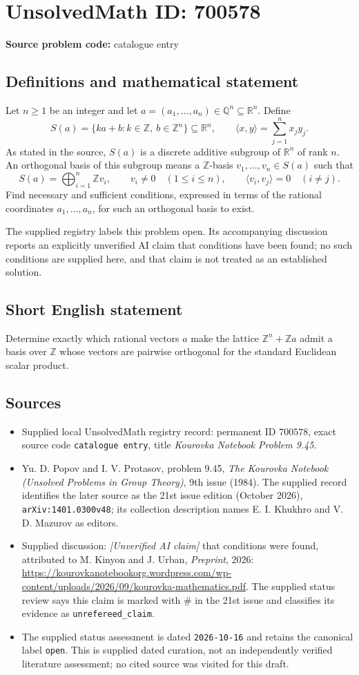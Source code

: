 \documentclass[11pt]{article}
\newcommand{\Z}{\mathbb{Z}}
\newcommand{\Q}{\mathbb{Q}}
\newcommand{\R}{\mathbb{R}}
\begin{document}
\section*{UnsolvedMath ID: 700578}
\textbf{Source problem code:} catalogue entry
\subsection{Definitions and mathematical statement}
Let \(n\geq 1\) be an integer and let \(a=(a_1,\ldots,a_n)\in\Q^n\subseteq\R^n\). Define
\[
S(a)=\{ka+b:k\in\Z,\ b\in\Z^n\}\subseteq\R^n,
\qquad
\langle x,y\rangle=\sum_{j=1}^n x_jy_j.
\]
As stated in the source, \(S(a)\) is a discrete additive subgroup of \(\R^n\) of rank \(n\). An orthogonal basis of this subgroup means a \(\Z\)-basis \(v_1,\ldots,v_n\in S(a)\) such that
\[
S(a)=\bigoplus_{i=1}^n\Z v_i,
\qquad
v_i\ne 0\quad(1\leq i\leq n),
\qquad
\langle v_i,v_j\rangle=0\quad(i\ne j).
\]
Find necessary and sufficient conditions, expressed in terms of the rational coordinates \(a_1,\ldots,a_n\), for such an orthogonal basis to exist.

The supplied registry labels this problem open. Its accompanying discussion reports an explicitly unverified AI claim that conditions have been found; no such conditions are supplied here, and that claim is not treated as an established solution.
\subsection{Short English statement}
Determine exactly which rational vectors \(a\) make the lattice \(\Z^n+\Z a\) admit a basis over \(\Z\) whose vectors are pairwise orthogonal for the standard Euclidean scalar product.
\subsection{Sources}
\begin{itemize}
\item Supplied local UnsolvedMath registry record: permanent ID \(700578\), exact source code \texttt{catalogue entry}, title \emph{Kourovka Notebook Problem 9.45}.
\item Yu. D. Popov and I. V. Protasov, problem 9.45, \emph{The Kourovka Notebook (Unsolved Problems in Group Theory)}, 9th issue (1984). The supplied record identifies the later source as the 21st issue edition (October 2026), \texttt{arXiv:1401.0300v48}; its collection description names E. I. Khukhro and V. D. Mazurov as editors.
\item Supplied discussion: \emph{[Unverified AI claim]} that conditions were found, attributed to M. Kinyon and J. Urban, \emph{Preprint}, 2026: \url{https://kourovkanotebookorg.wordpress.com/wp-content/uploads/2026/09/kourovka-mathematics.pdf}. The supplied status review says this claim is marked with \(\#\) in the 21st issue and classifies its evidence as \texttt{unrefereed\_claim}.
\item The supplied status assessment is dated \texttt{2026-10-16} and retains the canonical label \texttt{open}. This is supplied dated curation, not an independently verified literature assessment; no cited source was visited for this draft.
\end{itemize}
\end{document}
